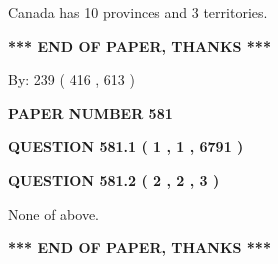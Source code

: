 \documentclass[12pt]{article}
\begin{document}
 
Canada has 10  provinces and 3 territories.
 
 
 
 
   
   
 \vspace{0.2in}
 
   
   
   
   
\vspace{1.0in} 
{\textbf{\large{ *** END OF PAPER, THANKS *** }}} 
   
   
\hspace{1.0in} By: 
 239 ( 416 ,  613 )
   
   
   
   
\newpage 
\setcounter{page}{ 
   581001 } 
   
   
   
   
 {\textbf{ \Large{ PAPER NUMBER  581  }}}
   
   
\vspace{0.2in}
   
   
   
   
   
   
 \vspace{0.2in}
 
 
 
 
   
   
  
\vspace{0.2in}
  
{\textbf{\Large{QUESTION
581.1 
 ( 1 , 1 , 6791 )
}}}
  
  
  
\vspace{0.2in}
  
{\textbf{\Large{QUESTION
581.2 
 ( 2 , 2 , 3 )
}}}
  
  
 
 
\noindent{}
 
 
 None of above.
 
 
 
 
   
   
 \vspace{0.2in}
 
   
   
   
   
\vspace{1.0in} 
{\textbf{\large{ *** END OF PAPER, THANKS *** }}} 
   
\end{document}
